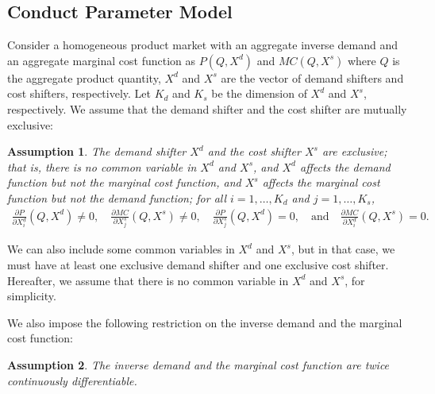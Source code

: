 \documentclass[11pt, a4paper]{article}
\newtheorem{assumption}{Assumption}
\theoremstyle{remark}
\begin{document}
\subsection{Conduct Parameter Model}\label{subsec:model_and_assumptions}

Consider a homogeneous product market with an aggregate inverse demand and an aggregate marginal cost function as $P(Q, X^{d})$ and $MC(Q, X^{s})$ where $Q$ is the aggregate product quantity, $X^{d}$ and $X^{s}$ are the vector of demand shifters and cost shifters, respectively.
Let $K_d$ and $K_s$ be the dimension of $X^{d}$ and $X^{s}$, respectively.
We assume that the demand shifter and the cost shifter are mutually exclusive:
\begin{assumption}\label{assumption:exclusive_shifters}
    The demand shifter $X^{d}$ and the cost shifter $X^{s}$ are exclusive; that is, there is no common variable in $X^{d}$ and $X^{s}$, and $X^{d}$ affects the demand function but not the marginal cost function, and $X^{s}$ affects the marginal cost function but not the demand function; for all $i = 1, \ldots, K_d$ and $j = 1, \ldots, K_s$,
    \begin{align}
        \frac{\partial P}{\partial X^{d}_{i}}(Q, X^{d}) \ne 0, \quad \frac{\partial MC}{\partial X^{s}_{j}}(Q, X^{s}) \ne 0, \quad \frac{\partial P}{\partial X^{s}_{j}}(Q, X^{d}) = 0, \quad \text{and} \quad \frac{\partial MC}{\partial X^{d}_{i}}(Q, X^{s}) = 0.
    \end{align}
\end{assumption}
We can also include some common variables in $X^{d}$ and $X^{s}$, but in that case, we must have at least one exclusive demand shifter and one exclusive cost shifter.
Hereafter, we assume that there is no common variable in $X^{d}$ and $X^{s}$, for simplicity.

We also impose the following restriction on the inverse demand and the marginal cost function:
\begin{assumption}\label{assumption:twice_differentiable}
    The inverse demand and the marginal cost function are twice continuously differentiable.
\end{assumption}
\end{document}
